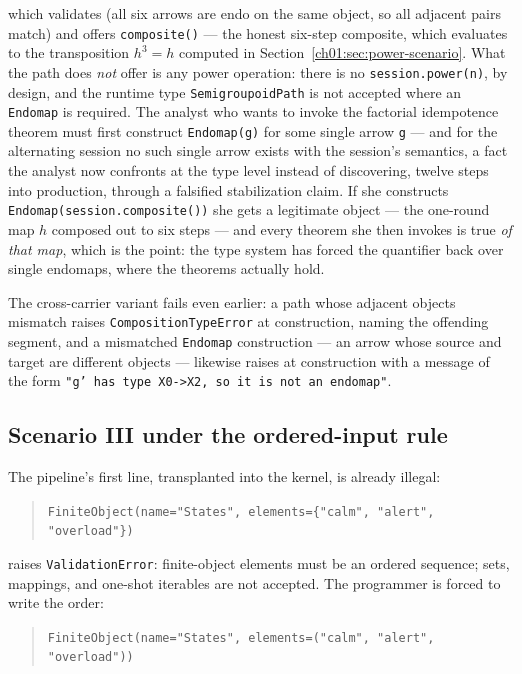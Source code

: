 which validates (all six arrows are endo on the same object, so all
adjacent pairs match) and offers \texttt{composite()} --- the honest
six-step composite, which evaluates to the transposition
$h^3 = h$ computed in Section~\ref{ch01:sec:power-scenario}. What the
path does \emph{not} offer is any power operation: there is no
\texttt{session.power(n)}, by design, and the runtime type
\texttt{SemigroupoidPath} is not accepted where an \texttt{Endomap} is
required. The analyst who wants to invoke the factorial idempotence
theorem must first construct \texttt{Endomap(g)} for some single arrow
\texttt{g} --- and for the alternating session no such single arrow
exists with the session's semantics, a fact the analyst now confronts at
the type level instead of discovering, twelve steps into production,
through a falsified stabilization claim. If she constructs
\texttt{Endomap(session.composite())} she gets a legitimate object ---
the one-round map $h$ composed out to six steps --- and every theorem she
then invokes is true \emph{of that map}, which is the point: the type
system has forced the quantifier back over single endomaps, where the
theorems actually hold.

The cross-carrier variant fails even earlier: a path whose adjacent
objects mismatch raises \texttt{CompositionTypeError} at construction,
naming the offending segment, and a mismatched \texttt{Endomap}
construction --- an arrow whose source and target are different objects
--- likewise raises at construction with a message of the form
\texttt{"g' has type X0->X2, so it is not an endomap"}.

\subsection{Scenario III under the ordered-input rule}

The pipeline's first line, transplanted into the kernel, is already
illegal:

\begin{quote}
\texttt{FiniteObject(name="States", elements=\{"calm", "alert",
"overload"\})}
\end{quote}

raises \texttt{ValidationError}: finite-object elements must be an
ordered sequence; sets, mappings, and one-shot iterables are not
accepted. The programmer is forced to write the order:

\begin{quote}
\texttt{FiniteObject(name="States", elements=("calm", "alert",
"overload"))}
\end{quote}

